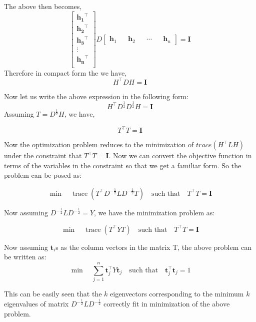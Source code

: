 \documentclass[english]{article}
\theoremstyle{plain}
\begin{document}
The above then becomes,
\begin{equation}
\begin{bmatrix}
\boldsymbol{h_{1}}^{\top} \\
\boldsymbol{h_{2}}^{\top} \\
\boldsymbol{h_{3}}^{\top} \\
\vdots \\
\boldsymbol{h_{n}}^{\top} \\
\end{bmatrix}
D
\begin{bmatrix}
\boldsymbol{h}_{1} && \boldsymbol{h}_{2} && \cdots && \boldsymbol{h}_{n} 
\end{bmatrix} = \boldsymbol{I} 
\end{equation}
Therefore in compact form the we have,
\begin{equation}
H^{\top}DH = \boldsymbol{I}
\end{equation}

Now let us write the above expression in the following form:
\begin{equation}
H^{\top}D^{\frac{1}{2}}D^{\frac{1}{2}}H = \boldsymbol{I}
\end{equation}
Assuming $T = D^{\frac{1}{2}}H$, we have,

\begin{equation}
T^{\top}T = \boldsymbol{I}
\end{equation}

Now the optimization problem reduces to the minimization of $trace(H^{\top}LH)$ under the constraint that $T^{\top}T = \boldsymbol{I}$. Now we can convert the objective function in terms of the variables in the constraint so that we get a familiar form. So the problem can be posed as:

\begin{equation}
\min \quad \operatorname{trace}\!\left(T^{\top}D^{-\frac{1}{2}}LD^{-\frac{1}{2}}T\right) \quad \text{such that} \quad T^{\top}T = \boldsymbol{I}
\end{equation}

Now assuming $D^{-\frac{1}{2}}LD^{-\frac{1}{2}}=Y$, we have the minimization problem as:

\begin{equation}
\min \quad \operatorname{trace}\!\left(T^{\top}YT\right) \quad \text{such that} \quad T^{\top}T = \boldsymbol{I}
\end{equation}

Now assuming $\boldsymbol{t}_{i}$s as the column vectors in the matrix T, the above problem can be written as:
\begin{equation}
\min \quad \sum_{j=1}^{n} \boldsymbol{t}_{j}^{\top}Y\boldsymbol{t}_{j} \quad \text{such that} \quad \boldsymbol{t}_{j}^{\top}\boldsymbol{t}_{j} = 1
\end{equation}

This can be easily seen that the $k$ eigenvectors corresponding to the minimum $k$ eigenvalues of matrix $D^{-\frac{1}{2}}LD^{-\frac{1}{2}}$ correctly fit in minimization of the above problem. 
\end{document}

